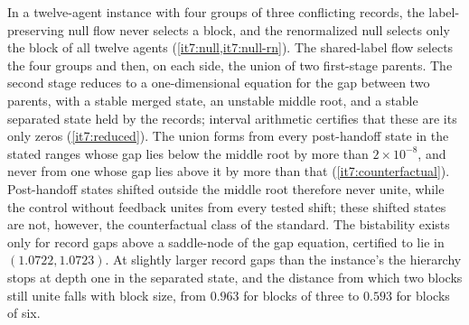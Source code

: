 \documentclass[11pt,letterpaper]{report}
\begin{document}
In a twelve-agent instance with four groups of three conflicting records, the label-preserving null flow never selects a block, and the renormalized null selects only the block of all twelve agents (\cref{it7:null,it7:null-rn}). The shared-label flow selects the four groups and then, on each side, the union of two first-stage parents. The second stage reduces to a one-dimensional equation for the gap between two parents, with a stable merged state, an unstable middle root, and a stable separated state held by the records; interval arithmetic certifies that these are its only zeros (\cref{it7:reduced}). The union forms from every post-handoff state in the stated ranges whose gap lies below the middle root by more than $2\times10^{-8}$, and never from one whose gap lies above it by more than that (\cref{it7:counterfactual}). Post-handoff states shifted outside the middle root therefore never unite, while the control without feedback unites from every tested shift; these shifted states are not, however, the counterfactual class of the standard. The bistability exists only for record gaps above a saddle-node of the gap equation, certified to lie in $(1.0722,1.0723)$. At slightly larger record gaps than the instance's the hierarchy stops at depth one in the separated state, and the distance from which two blocks still unite falls with block size, from $0.963$ for blocks of three to $0.593$ for blocks of six.
\end{document}
